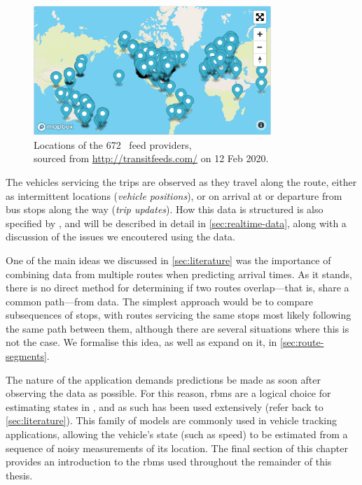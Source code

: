 \begin{figure}
\centering
\includegraphics[width=0.8\textwidth]{figure/gtfs_feeds.png}
\caption[Locations of GTFS feed providers]{Locations of the 672~\GTFS{} feed providers,\\
sourced from \url{http://transitfeeds.com/} on 12 Feb 2020.}
\label{fig:gtfs_feeds}
\end{figure}


The vehicles servicing the trips are observed as they travel along the route, either as intermittent \GPS{} locations (\emph{vehicle positions}), or on arrival at or departure from bus stops along the way (\emph{trip updates}). How this data is structured is also specified by \GTFS, and will be described in detail in \cref{sec:realtime-data}, along with a discussion of the issues we encoutered using the \AT{} data.


One of the main ideas we discussed in \cref{sec:literature} was the importance of combining data from multiple routes when predicting arrival times. As it stands, there is no direct method for determining if two routes overlap---that is, share a common path---from \GTFS{} data. The simplest approach would be to compare subsequences of stops, with routes servicing the same stops most likely following the same path between them, although there are several situations where this is not the case. We formalise this idea, as well as expand on it, in \cref{sec:route-segments}.


The \rt{} nature of the application demands predictions be made as soon after observing the data as possible. For this reason, \glspl{rbm} are a logical choice for estimating states in \rt{}, and as such has been used extensively (refer back to \cref{sec:literature}). This family of models are commonly used in vehicle tracking applications, allowing the vehicle's state (such as speed) to be estimated from a \rt{} sequence of noisy measurements of its location. The final section of this chapter provides an introduction to the \glspl{rbm} used throughout the remainder of this thesis.








